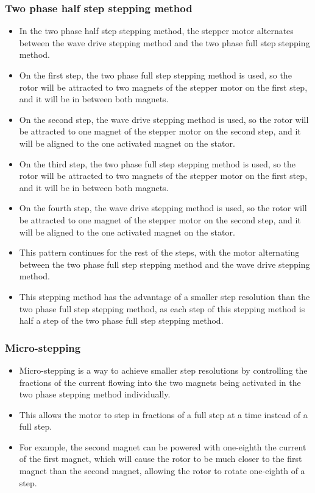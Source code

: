 \documentclass[11pt]{article}
\begin{document}
\subsubsection{Two phase half step stepping method}
\label{sec:org2b242db}
\begin{itemize}
\item In the two phase half step stepping method, the stepper motor alternates between the wave drive stepping method and the two phase full step stepping method.
\item On the first step, the two phase full step stepping method is used, so the rotor will be attracted to two magnets of the stepper motor on the first step, and it will be in between both magnets.
\item On the second step, the wave drive stepping method is used, so the rotor will be attracted to one magnet of the stepper motor on the second step, and it will be aligned to the one activated magnet on the stator.
\item On the third step, the two phase full step stepping method is used, so the rotor will be attracted to two magnets of the stepper motor on the first step, and it will be in between both magnets.
\item On the fourth step, the wave drive stepping method is used, so the rotor will be attracted to one magnet of the stepper motor on the second step, and it will be aligned to the one activated magnet on the stator.
\item This pattern continues for the rest of the steps, with the motor alternating between the two phase full step stepping method and the wave drive stepping method.
\item This stepping method has the advantage of a smaller step resolution than the two phase full step stepping method, as each step of this stepping method is half a step of the two phase full step stepping method.
\end{itemize}

 \newpage

\subsubsection{Micro-stepping}
\label{sec:orgce66542}
\begin{itemize}
\item Micro-stepping is a way to achieve smaller step resolutions by controlling the fractions of the current flowing into the two magnets being activated in the two phase stepping method individually.
\item This allows the motor to step in fractions of a full step at a time instead of a full step.
\item For example, the second magnet can be powered with one-eighth the current of the first magnet, which will cause the rotor to be much closer to the first magnet than the second magnet, allowing the rotor to rotate one-eighth of a step.
\end{itemize}
\end{document}
